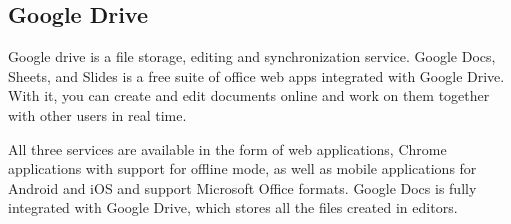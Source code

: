 \subsection{Google Drive}
Google drive is a file storage, editing and synchronization service. Google Docs, Sheets, and Slides is a free suite of office web apps integrated with Google Drive. With it, you can create and edit documents online and work on them together with other users in real time. 

All three services are available in the form of web applications, Chrome applications with support for offline mode, as well as mobile applications for Android and iOS and support Microsoft Office formats. Google Docs is fully integrated with Google Drive, which stores all the files created in editors.